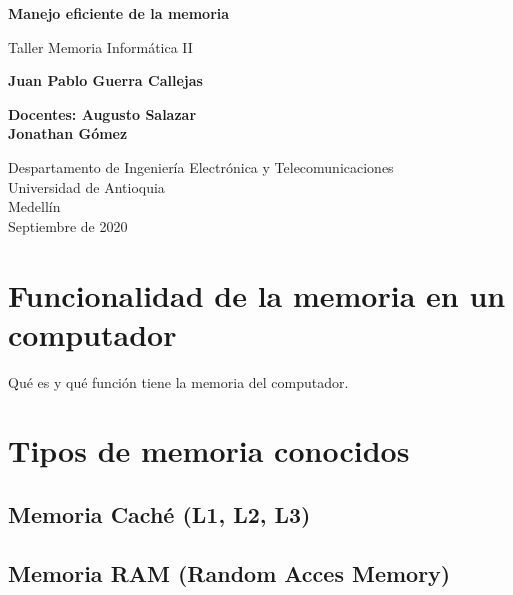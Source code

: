 \documentclass{article}
\begin{document}
\begin{titlepage}
    \begin{center}
        \vspace*{1cm}
            
        \Huge
        \textbf{Manejo eficiente de la memoria}
            
        \vspace{0.8 cm}
        \LARGE
        Taller Memoria Informática II
            
        \vspace{1.5cm}
            
        \textbf{Juan Pablo Guerra Callejas}
        
        \vspace{0.8 cm}
        
        \textbf{Docentes: Augusto Salazar\\
                Jonathan Gómez}
        \vfill
            
        \vspace{0.8cm}
            
        \Large
        Despartamento de Ingeniería Electrónica y Telecomunicaciones\\
        Universidad de Antioquia\\
        Medellín\\
        Septiembre de 2020
            
    \end{center}
\end{titlepage}

\tableofcontents
\newpage
\section{Funcionalidad de la memoria en un computador}\label{intro}

Qué es y qué función tiene la memoria del computador.

\section{Tipos de memoria conocidos} \label{contenido}


\subsection{Memoria Caché (L1, L2, L3)}
\subsection{Memoria RAM (Random Acces Memory)}
\end{document}
